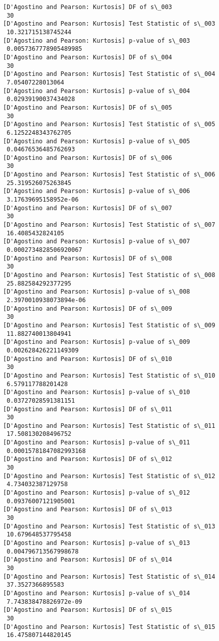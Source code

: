 \documentclass[11pt]{article}
\begin{document}
\begin{Verbatim}[commandchars=\\\{\}]
[D'Agostino and Pearson: Kurtosis] DF of s\_003
 30
[D'Agostino and Pearson: Kurtosis] Test Statistic of s\_003
 10.321715138745244
[D'Agostino and Pearson: Kurtosis] p-value of s\_003
 0.0057367778905489985
[D'Agostino and Pearson: Kurtosis] DF of s\_004
 30
[D'Agostino and Pearson: Kurtosis] Test Statistic of s\_004
 7.05407228013064
[D'Agostino and Pearson: Kurtosis] p-value of s\_004
 0.02939190037434028
[D'Agostino and Pearson: Kurtosis] DF of s\_005
 30
[D'Agostino and Pearson: Kurtosis] Test Statistic of s\_005
 6.1252248343762705
[D'Agostino and Pearson: Kurtosis] p-value of s\_005
 0.04676536485762693
[D'Agostino and Pearson: Kurtosis] DF of s\_006
 30
[D'Agostino and Pearson: Kurtosis] Test Statistic of s\_006
 25.319526075263845
[D'Agostino and Pearson: Kurtosis] p-value of s\_006
 3.17639695158952e-06
[D'Agostino and Pearson: Kurtosis] DF of s\_007
 30
[D'Agostino and Pearson: Kurtosis] Test Statistic of s\_007
 16.4085432824105
[D'Agostino and Pearson: Kurtosis] p-value of s\_007
 0.0002734828506920067
[D'Agostino and Pearson: Kurtosis] DF of s\_008
 30
[D'Agostino and Pearson: Kurtosis] Test Statistic of s\_008
 25.882584292377295
[D'Agostino and Pearson: Kurtosis] p-value of s\_008
 2.3970010938073894e-06
[D'Agostino and Pearson: Kurtosis] DF of s\_009
 30
[D'Agostino and Pearson: Kurtosis] Test Statistic of s\_009
 11.882740013804941
[D'Agostino and Pearson: Kurtosis] p-value of s\_009
 0.002628426221149309
[D'Agostino and Pearson: Kurtosis] DF of s\_010
 30
[D'Agostino and Pearson: Kurtosis] Test Statistic of s\_010
 6.579117788201428
[D'Agostino and Pearson: Kurtosis] p-value of s\_010
 0.03727028591381151
[D'Agostino and Pearson: Kurtosis] DF of s\_011
 30
[D'Agostino and Pearson: Kurtosis] Test Statistic of s\_011
 17.508130208496752
[D'Agostino and Pearson: Kurtosis] p-value of s\_011
 0.00015781847082993168
[D'Agostino and Pearson: Kurtosis] DF of s\_012
 30
[D'Agostino and Pearson: Kurtosis] Test Statistic of s\_012
 4.734032387129758
[D'Agostino and Pearson: Kurtosis] p-value of s\_012
 0.09376007121905001
[D'Agostino and Pearson: Kurtosis] DF of s\_013
 30
[D'Agostino and Pearson: Kurtosis] Test Statistic of s\_013
 10.679648537795458
[D'Agostino and Pearson: Kurtosis] p-value of s\_013
 0.004796713567998678
[D'Agostino and Pearson: Kurtosis] DF of s\_014
 30
[D'Agostino and Pearson: Kurtosis] Test Statistic of s\_014
 37.3527366895583
[D'Agostino and Pearson: Kurtosis] p-value of s\_014
 7.743838478826972e-09
[D'Agostino and Pearson: Kurtosis] DF of s\_015
 30
[D'Agostino and Pearson: Kurtosis] Test Statistic of s\_015
 16.475807144820145

\end{Verbatim}
\end{document}
